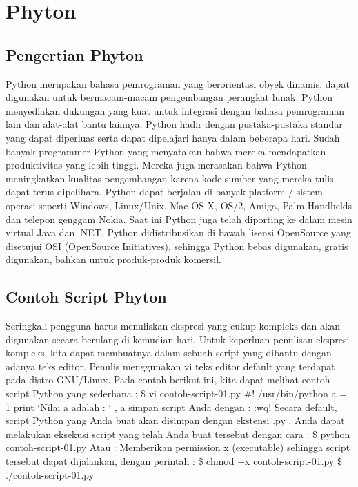 
\section{Phyton} 
\subsection{Pengertian Phyton}
Python merupakan bahasa pemrograman yang
berorientasi obyek dinamis, dapat digunakan
untuk bermacam-macam pengembangan perangkat
lunak. Python
menyediakan dukungan yang kuat untuk integrasi
dengan bahasa pemrograman lain dan alat-alat
bantu lainnya. Python hadir dengan pustaka-pustaka
standar yang dapat diperluas serta dapat
dipelajari hanya dalam beberapa hari. Sudah
banyak programmer Python yang menyatakan
bahwa mereka mendapatkan produktivitas yang
lebih tinggi. Mereka juga merasakan bahwa Python
meningkatkan kualitas pengembangan karena kode
sumber yang mereka tulis dapat terus dipelihara.
Python dapat berjalan di banyak platform / sistem
operasi seperti Windows, Linux/Unix, Mac OS X,
OS/2, Amiga, Palm Handhelds dan telepon genggam
Nokia. Saat ini Python juga telah diporting ke dalam
mesin virtual Java dan .NET.
Python didistribusikan di bawah lisensi
OpenSource yang disetujui OSI (OpenSource
Initiatives), sehingga Python bebas digunakan,
gratis digunakan, bahkan untuk produk-produk
komersil.

\subsection{Contoh Script Phyton}
Seringkali pengguna harus menuliskan ekspresi yang cukup kompleks dan akan digunakan secara berulang di kemudian hari. 
Untuk keperluan penulisan ekspresi kompleks, kita dapat membuatnya dalam sebuah script yang dibantu dengan adanya teks editor. 
Penulis menggunakan vi teks editor default yang terdapat pada distro GNU/Linux. Pada contoh berikut ini, 
kita dapat melihat contoh script Python yang sederhana : 
\$ vi contoh-script-01.py \#! /usr/bin/python a = 1 print 
‘Nilai a adalah : ‘ , a simpan script Anda dengan : :wq! Secara default, script Python yang Anda buat akan disimpan dengan ekstensi .py . 
Anda dapat melakukan eksekusi script yang telah Anda buat tersebut dengan cara : 
\$ python contoh-script-01.py 
Atau : Memberikan permission x (executable) sehingga script tersebut dapat dijalankan, 
dengan perintah : \$ chmod +x contoh-script-01.py \$ ./contoh-script-01.py


